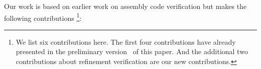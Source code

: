 
Our work is based on earlier work on assembly code
verification but makes the following contributions
\footnote{We list six contributions here. The
first four contributions have already presented
in the preliminary version~\cite{zha18aplas}
of this paper. And the
additional two contributions about refinement
verification are our new contributions.}:




